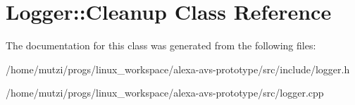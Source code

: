 \hypertarget{classLogger_1_1Cleanup}{}\section{Logger\+:\+:Cleanup Class Reference}
\label{classLogger_1_1Cleanup}


The documentation for this class was generated from the following files\+:\begin{DoxyCompactItemize}
\item 
/home/mutzi/progs/linux\+\_\+workspace/alexa-\/avs-\/prototype/src/include/logger.\+h\item 
/home/mutzi/progs/linux\+\_\+workspace/alexa-\/avs-\/prototype/src/logger.\+cpp\end{DoxyCompactItemize}

